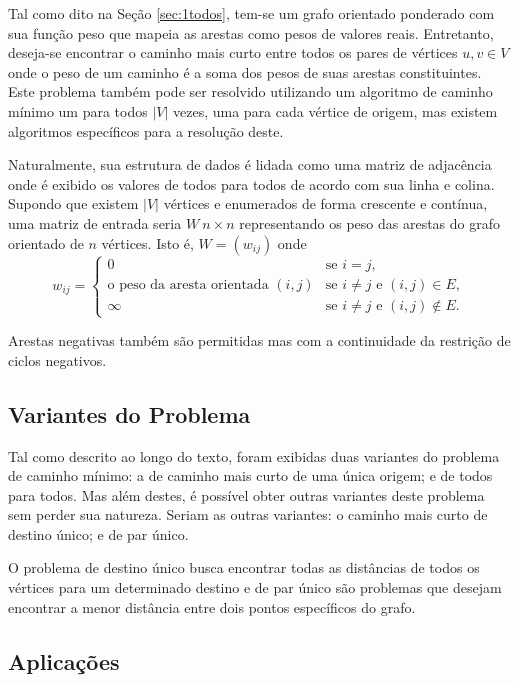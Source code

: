 \documentclass[12pt]{article}
\begin{document}
Tal como dito na Seção \ref{sec:1todos}, tem-se um grafo orientado ponderado com sua função peso que mapeia as arestas como pesos de valores reais. Entretanto, deseja-se encontrar o caminho mais curto entre todos os pares de vértices $u,v \in V$ onde o peso de um caminho é a soma dos pesos de suas arestas constituintes. Este problema também pode ser resolvido utilizando um algoritmo de caminho mínimo um para todos $|V|$ vezes, uma para cada vértice de origem, mas existem algoritmos específicos para a resolução deste.

Naturalmente, sua estrutura de dados é lidada como uma matriz de adjacência onde é exibido os valores de todos para todos de acordo com sua linha e colina. Supondo que existem $|V|$ vértices e enumerados de forma crescente e contínua, uma matriz de entrada seria $W\ n \times n$ representando os peso das arestas do grafo orientado de $n$ vértices. Isto é, $W = (w_{ij})$ onde 
$$
w_{ij} = 
	\begin{cases}
    	0 & \mbox{se } i = j, \\
        \mbox{o peso da aresta orientada } (i, j) & \mbox{se } i \neq j \mbox{ e } (i, j) \in E, \\
        \infty & \mbox{se } i \neq j \mbox{ e } (i, j) \notin E.
    \end{cases}
$$

Arestas negativas também são permitidas mas com a continuidade da restrição de ciclos negativos. 



\subsection{Variantes do Problema}

Tal como descrito ao longo do texto, foram exibidas duas variantes do problema de caminho mínimo: a de caminho mais curto de uma única origem; e de todos para todos. Mas além destes, é possível obter outras variantes deste problema sem perder sua natureza. Seriam as outras variantes: o caminho mais curto de destino único; e de par único.

	O problema de destino único busca encontrar todas as distâncias de todos os vértices para um determinado destino e de par único são problemas que desejam encontrar a menor distância entre dois pontos específicos do grafo.



\subsection{Aplicações}
\end{document}
